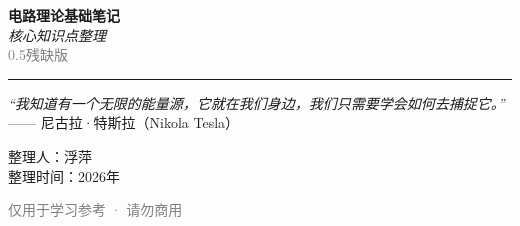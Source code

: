 \begin{titlepage}
    \centering
    
    \vspace*{2cm}
    
    {\Huge \bfseries 电路理论基础笔记} \\
    \vspace{0.8cm}
    {\Large \textit{核心知识点整理}} \\
    \vspace{0.5cm}
    {\large \textcolor{gray}{0.5残缺版}} \\
    
    \vspace{2cm}
    \rule{8cm}{0.5pt}
    \vspace{2cm}
    
    {\Large \textit{“我知道有一个无限的能量源，它就在我们身边，我们只需要学会如何去捕捉它。”}} \\
    \vspace{1cm}
    {\large —— 尼古拉·特斯拉（Nikola Tesla）}
    
    \vspace{5cm}
    
    {\large 整理人：浮萍} \\
    \vspace{0.5cm}
    {\large 整理时间：2026年} \\
    
    \vfill
    
    {\small \textcolor{gray}{仅用于学习参考 · 请勿商用}}
\end{titlepage}

\clearpage
\thispagestyle{empty}  %